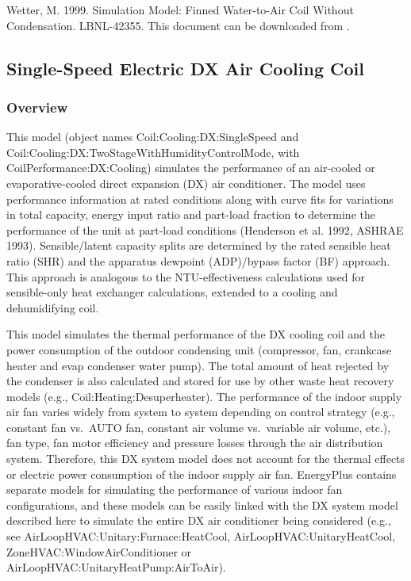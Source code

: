 Wetter, M. 1999. Simulation Model: Finned Water-to-Air Coil Without Condensation. LBNL-42355. This document can be downloaded from .

\subsection{Single-Speed Electric DX Air Cooling Coil}\label{single-speed-electric-dx-air-cooling-coil}

\subsubsection{Overview}\label{overview-1-004}

This model (object names Coil:Cooling:DX:SingleSpeed and \\ Coil:Cooling:DX:TwoStageWithHumidityControlMode, with CoilPerformance:DX:Cooling) simulates the performance of an air-cooled or evaporative-cooled direct expansion (DX) air conditioner. The model uses performance information at rated conditions along with curve fits for variations in total capacity, energy input ratio and part-load fraction to determine the performance of the unit at part-load conditions (Henderson et al. 1992, ASHRAE 1993). Sensible/latent capacity splits are determined by the rated sensible heat ratio (SHR) and the apparatus dewpoint (ADP)/bypass factor (BF) approach. This approach is analogous to the NTU-effectiveness calculations used for sensible-only heat exchanger calculations, extended to a cooling and dehumidifying coil.

This model simulates the thermal performance of the DX cooling coil and the power consumption of the outdoor condensing unit (compressor, fan, crankcase heater and evap condenser water pump). The total amount of heat rejected by the condenser is also calculated and stored for use by other waste heat recovery models (e.g., Coil:Heating:Desuperheater). The performance of the indoor supply air fan varies widely from system to system depending on control strategy (e.g., constant fan vs.~AUTO fan, constant air volume vs.~variable air volume, etc.), fan type, fan motor efficiency and pressure losses through the air distribution system. Therefore, this DX system model does not account for the thermal effects or electric power consumption of the indoor supply air fan. EnergyPlus contains separate models for simulating the performance of various indoor fan configurations, and these models can be easily linked with the DX system model described here to simulate the entire DX air conditioner being considered (e.g., see AirLoopHVAC:Unitary:Furnace:HeatCool, AirLoopHVAC:UnitaryHeatCool, ZoneHVAC:WindowAirConditioner or AirLoopHVAC:UnitaryHeatPump:AirToAir).

